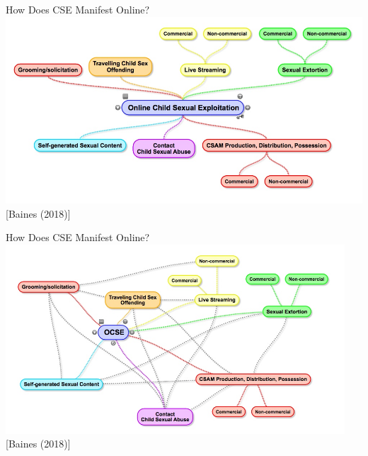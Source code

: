 \documentclass[nobackground,dvipsnames,table,aspectratio=169]{beamer}
\begin{document}
\begin{frame}{How Does CSE Manifest Online?}
    \centering
    \includegraphics[width=\textwidth]{ocse}
    [Baines (2018)]
\end{frame}

\begin{frame}{How Does CSE Manifest Online?}
    \centering
    \includegraphics[width=0.95\textwidth]{ocse-2}
    [Baines (2018)]
\end{frame}
\end{document}
